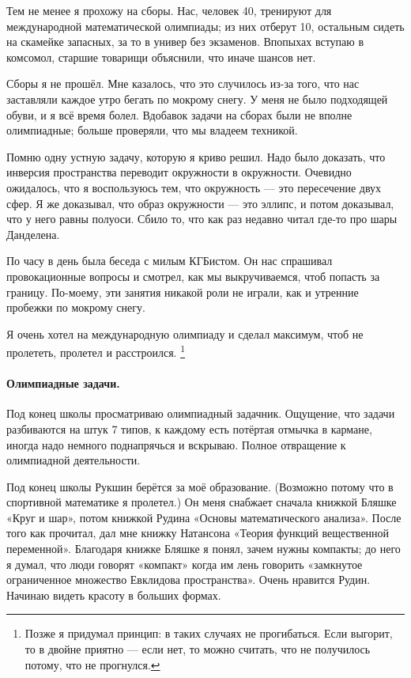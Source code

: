 \documentclass{book}
\begin{document}
Тем не менее я прохожу на сборы.
Нас, человек 40, тренируют для международной математической олимпиады;
из них отберут 10, остальным сидеть на скамейке запасных, за то в универ без экзаменов.
Впопыхах вступаю в комсомол, старшие товарищи объяснили, что иначе шансов нет.

Сборы я не прошёл.
Мне казалось, что это случилось из-за того, что нас заставляли каждое утро бегать по мокрому снегу.
У меня не было подходящей обуви, и я всё время болел.
Вдобавок задачи на сборах были не вполне олимпиадные;
больше проверяли, что мы владеем техникой.

Помню одну устную задачу, которую я криво решил.
Надо было доказать, что инверсия пространства переводит окружности в окружности.
Очевидно ожидалось, что я воспользуюсь тем,
что окружность --- это пересечение двух сфер.
Я же доказывал, что образ окружности --- это эллипс,
и потом доказывал, что у него равны полуоси.
Сбило то, что как раз недавно читал где-то про шары Данделена.

По часу в день была
беседа с милым КГБистом.
Он нас спрашивал провокационные вопросы
и смотрел, как мы выкручиваемся, 
чтоб попасть за границу.
По-моему, эти занятия никакой роли не играли,
как и утренние пробежки по мокрому снегу.

Я очень хотел на международную олимпиаду и сделал максимум, чтоб не пролететь,
пролетел и расстроился.%
\footnote{Позже я придумал принцип: в таких случаях не прогибаться.
Если выгорит, то в двойне приятно --- если нет, 
то  можно считать, что не получилось потому, что не прогнулся.}

\paragraph{Олимпиадные задачи.}
Под конец школы просматриваю олимпиадный задачник.
Ощущение, что задачи разбиваются на штук 7 типов,
к каждому есть потёртая отмычка в кармане,
иногда надо немного поднапрячься и вскрываю.
Полное отвращение к олимпиадной деятельности.

Под конец школы Рукшин берётся за моё образование.
(Возможно потому что в спортивной математике я пролетел.)
Он меня снабжает сначала книжкой Бляшке «Круг и шар»,
потом
книжкой Рудина «Основы математического анализа».
После того как прочитал, дал мне книжку Натансона «Теория функций вещественной переменной».
Благодаря книжке Бляшке я понял, зачем нужны компакты;
до него я думал, что люди говорят «компакт» когда им лень говорить «замкнутое ограниченное множество Евклидова пространства».
Очень нравится Рудин.
Начинаю видеть красоту в больших формах.
\end{document}
